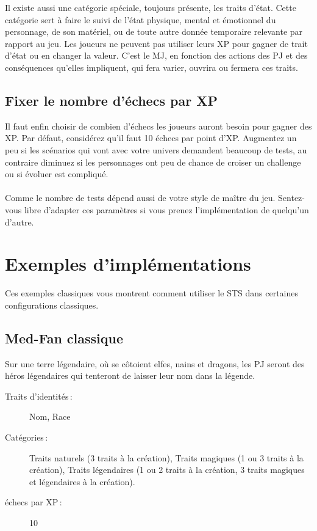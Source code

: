 \documentclass[a4paper,10pt,twoside,twocolumn]{article}
\begin{document}
Il existe aussi une catégorie spéciale, toujours présente, les traits d'état. Cette catégorie sert à faire le suivi de l'état physique, mental et émotionnel du personnage, de son matériel, ou de toute autre donnée temporaire relevante par rapport au jeu. Les joueurs ne peuvent pas utiliser leurs XP pour gagner de trait d'état ou en changer la valeur. C'est le MJ, en fonction des actions des PJ et des conséquences qu'elles impliquent, qui fera varier, ouvrira ou fermera ces traits.
 
 \subsection{Fixer le nombre d'échecs par XP}
 \label{implem::xp}
 
 Il faut enfin choisir de combien d'échecs les joueurs auront besoin pour gagner des XP. Par défaut, considérez qu'il faut 10 échecs par point d'XP. Augmentez un peu si les scénarios qui vont avec votre univers demandent beaucoup de tests, au contraire diminuez si les personnages ont peu de chance de croiser un challenge ou si évoluer est compliqué.\\
 \\
 Comme le nombre de tests dépend aussi de votre style de maître du jeu. Sentez-vous libre d'adapter ces paramètres si vous prenez l'implémentation de quelqu'un d'autre.
 
 \section{Exemples d'implémentations}
 \label{exempl}
 
 Ces exemples classiques vous montrent comment utiliser le STS dans certaines configurations classiques.
 
 \subsection{Med-Fan classique}
 
 Sur une terre légendaire, où se côtoient elfes, nains et dragons, les PJ seront des héros légendaires qui tenteront de laisser leur nom dans la légende. 
 
 \begin{description}
  \item [Traits d'identités\,:] Nom, Race
  \item [Catégories\,:] Traits naturels (3 traits à la création), Traits magiques (1 ou 3 traits à la création), Traits légendaires (1 ou 2 traits à la création, 3 traits magiques et légendaires à la création).
  \item [échecs par XP\,:] 10
 \end{description}
 
\end{document}
